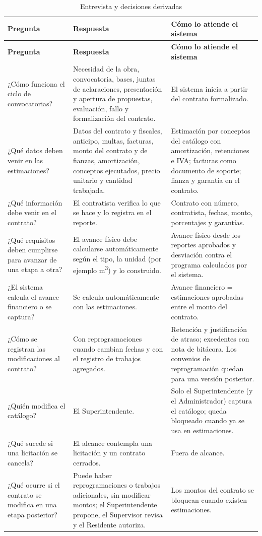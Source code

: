 \begin{xltabular}{\linewidth}{@{}>{\small}p{4.2cm}>{\small}X>{\small}p{4.4cm}@{}}
\caption{Entrevista y decisiones derivadas}\label{tab:entrevista}\\
\toprule
\sffamily\bfseries Pregunta & \sffamily\bfseries Respuesta & \sffamily\bfseries Cómo lo atiende el sistema\\\midrule\endfirsthead
\toprule
\sffamily\bfseries Pregunta & \sffamily\bfseries Respuesta & \sffamily\bfseries Cómo lo atiende el sistema\\\midrule\endhead
\bottomrule\endfoot
¿Cómo funciona el ciclo de convocatorias? & Necesidad de la obra, convocatoria, bases, juntas de aclaraciones, presentación y apertura de propuestas, evaluación, fallo y formalización del contrato. & El sistema inicia a partir del contrato formalizado.\\
¿Qué datos deben venir en las estimaciones? & Datos del contrato y fiscales, anticipo, multas, facturas, monto del contrato y de fianzas, amortización, conceptos ejecutados, precio unitario y cantidad trabajada. & Estimación por conceptos del catálogo con amortización, retenciones e IVA; facturas como documento de soporte; fianza y garantía en el contrato.\\
¿Qué información debe venir en el contrato? & El contratista verifica lo que se hace y lo registra en el reporte. & Contrato con número, contratista, fechas, monto, porcentajes y garantías.\\
¿Qué requisitos deben cumplirse para avanzar de una etapa a otra? & El avance físico debe calcularse automáticamente según el tipo, la unidad (por ejemplo m\textsuperscript{3}) y lo construido. & Avance físico desde los reportes aprobados y desviación contra el programa calculados por el sistema.\\
¿El sistema calcula el avance financiero o se captura? & Se calcula automáticamente con las estimaciones. & Avance financiero = estimaciones aprobadas entre el monto del contrato.\\
¿Cómo se registran las modificaciones al contrato? & Con reprogramaciones cuando cambian fechas y con el registro de trabajos agregados. & Retención y justificación de atraso; excedentes con nota de bitácora. Los convenios de reprogramación quedan para una versión posterior.\\
¿Quién modifica el catálogo? & El Superintendente. & Solo el Superintendente (y el Administrador) captura el catálogo; queda bloqueado cuando ya se usa en estimaciones.\\
¿Qué sucede si una licitación se cancela? & El alcance contempla una licitación y un contrato cerrados. & Fuera de alcance.\\
¿Qué ocurre si el contrato se modifica en una etapa posterior? & Puede haber reprogramaciones o trabajos adicionales, sin modificar montos; el Superintendente propone, el Supervisor revisa y el Residente autoriza. & Los montos del contrato se bloquean cuando existen estimaciones.\\
\end{xltabular}
